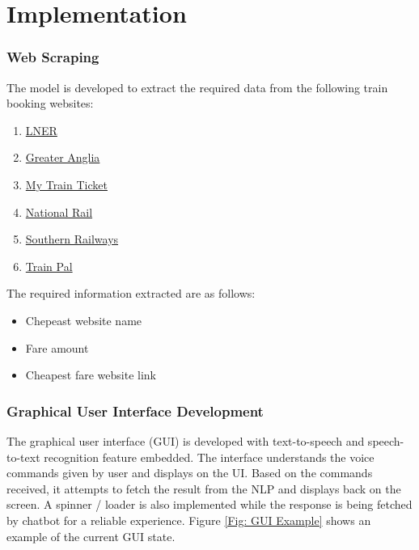 \section{Implementation}

\subsubsection{Web Scraping}
The model is developed to extract the required data from the following train booking websites:
\begin{enumerate}
    \item \href{https://www.lner.co.uk/}{LNER}
    \item \href{https://www.greateranglia.co.uk/}{Greater Anglia}
    \item \href{https://www.mytrainticket.co.uk/}{My Train Ticket}
    \item \href{https://www.nationalrail.co.uk/}{National Rail}
    \item \href{https://www.southernrailway.com/}{Southern Railways}
    \item \href{https://www.mytrainpal.com/}{Train Pal}
\end{enumerate}

The required information extracted are as follows:

\begin{itemize}
    \item Chepeast website name
    \item Fare amount
    \item Cheapest fare website link
\end{itemize} 

\subsubsection{Graphical User Interface Development}
The graphical user interface (GUI) is developed with text-to-speech and speech-to-text recognition feature embedded. The interface understands the voice commands given by user and displays on the UI. Based on the commands received, it attempts to fetch the result from the NLP and displays back on the screen. A spinner / loader is also implemented while the response is being fetched by chatbot for a reliable experience. Figure \ref{Fig: GUI Example} shows an example of the current GUI state.

